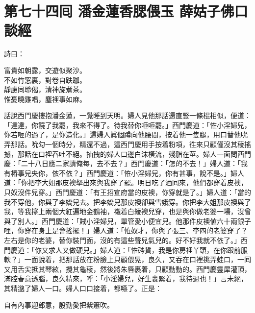 
\chapter*{第七十四囘 潘金蓮香腮偎玉 薛姑子佛口談經}


詩曰：

\begin{myquote}
富貴如朝露，交遊似聚沙。\\不如竹窓裏，對卷自趺跏。\\靜慮同聆偈，清神旋煮茶。\\惟憂曉雞唱，塵裡事如麻。
\end{myquote}

話說西門慶摟抱潘金蓮，一覺睡到天明。婦人見他那話還直豎一條棍相似，便道：「達達，你饒了我罷，我來不得了。{}待我替你咂咂罷。」西門慶道：「恠小淫婦兒，你若咂的過了，是你造化。」這婦人眞個蹲向他腰間，按着他一隻腿，用口替他吮弄那話。吮勾一個時分，精還不過，這西門慶用手按着粉項，徃來只顧僅沒其稜搖撼，那話在口裡吞吐不絕。抽拽的婦人口邊白沫橫流，殘脂在莖。婦人一面問西門慶：「二十八日應二家請俺每，去不去？」西門慶道：「怎的不去！」婦人道：「我有樁事兒央你，依不依？」{}西門慶道：「恠小淫婦兒，你有甚事，說不是。」婦人道：「你把李大姐那皮襖拏出來與我穿了罷。明日吃了酒囘來，他們都穿着皮襖，只奴沒件兒穿。」西門慶道：「有王招宣府當的皮襖，你穿就是了。」婦人道：「當的我不穿他，你與了李嬌兒去。把李嬌兒那皮襖卻與雪娥穿。你把李大姐那皮襖與了我，等我㩟上兩個大紅遍地金鶴袖，襯着白綾襖兒穿，也是與你做老婆一場，沒曾與了別人。」{}西門慶道：「賊小淫婦兒，單管愛小便宜兒。他那件皮襖値六十兩銀子哩，你穿在身上是會搖擺！」婦人道：「恠奴才，你與了張三、李四的老婆穿了？左右是你的老婆，替你裝門面，沒的有這些聲兒氣兒的。好不好我就不依了。」西門慶道：「你又求人又做硬兒。」婦人道：「恠硶貨，我是你房裡丫頭，在你跟前服軟？」一面說着，把那話放在粉臉上只顧偎晃，良久，又吞在口裡挑弄蛙口，一囘又用舌尖抵其琴絃，攪其龜稜，然後將朱唇裹着，只顧動動的。西門慶靈犀灌頂，滿腔春意透腦，良久精來，呼：「小淫婦兒，好生裹緊着，我待過也！」言未絕，其精邈了婦人一口。婦人口口接着，都嚥了。正是：

\begin{myquote}
自有內事迎郎意，殷勤愛把紫簫吹。
\end{myquote}

